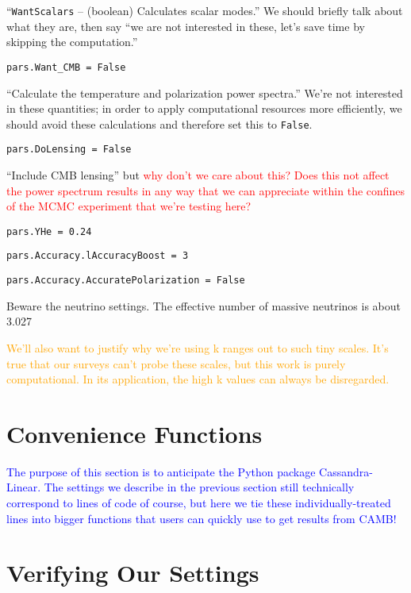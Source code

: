 ``\verb|WantScalars| – (boolean) Calculates scalar modes.'' We should briefly 
talk about what they are, then say ``we are not interested in these, let's 
save time by skipping the computation.''

\verb|pars.Want_CMB = False|

``Calculate the temperature and polarization power spectra.'' We're not 
interested in these quantities; in order to apply computational resources more 
efficiently, we should avoid these calculations and therefore set this to 
\verb|False|.

\verb|pars.DoLensing = False|

``Include CMB lensing'' but \textcolor{red}{why don't we care about this? Does
this not affect the power spectrum results in any way that we can appreciate
within the confines of the MCMC experiment that we're testing here?}

\verb|pars.YHe = 0.24|

\verb|pars.Accuracy.lAccuracyBoost = 3|

\verb|pars.Accuracy.AccuratePolarization = False|


Beware the neutrino settings. The effective number of massive neutrinos is about 3.027

\textcolor{orange}{We'll also want to justify why we're using k ranges out to
such tiny scales. It's true that our surveys can't probe these scales, but
this work is purely computational. In its application, the high k values can
always be disregarded.}

\section{Convenience Functions}


\textcolor{blue}{The purpose of this section is to anticipate the Python
package Cassandra-Linear. The settings we describe in the previous section
still technically correspond to lines of code of course, but here we tie these
individually-treated lines into bigger functions that users can quickly use to
get results from CAMB!}

\section{Verifying Our Settings}



